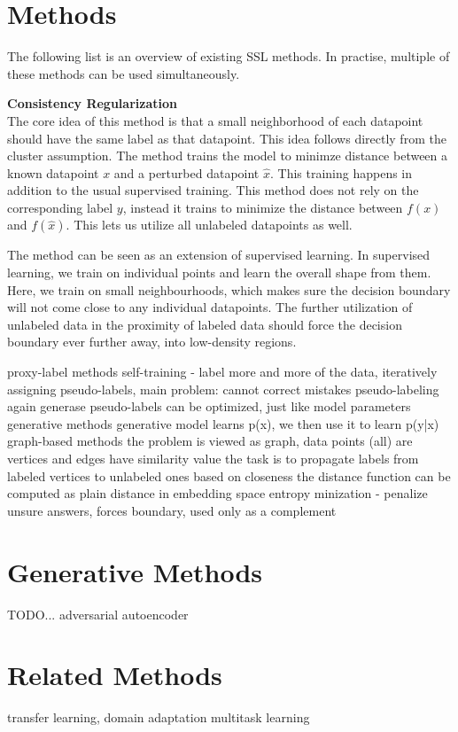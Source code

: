 \section{Methods}
\label{sec:SslMethods}

The following list is an overview of existing SSL methods. In practise, multiple of these methods can be used simultaneously.

\textbf{Consistency Regularization} \\ The core idea of this method is that a small neighborhood of each datapoint should have the same label as that datapoint. This idea follows directly from the cluster assumption. The method trains the model to minimze distance between a known datapoint $x$ and a perturbed datapoint $\hat{x}$. This training happens in addition to the usual supervised training. This method does not rely on the corresponding label $y$, instead it trains to minimize the distance between $f(x)$ and $f(\hat{x})$. This lets us utilize all unlabeled datapoints as well.

The method can be seen as an extension of supervised learning. In supervised learning, we train on individual points and learn the overall shape from them. Here, we train on small neighbourhoods, which makes sure the decision boundary will not come close to any individual datapoints. The further utilization of unlabeled data in the proximity of labeled data should force the decision boundary ever further away, into low-density regions.



proxy-label methods
    self-training - label more and more of the data, iteratively
        assigning pseudo-labels, main problem: cannot correct mistakes
    pseudo-labeling
        again generase pseudo-labels
        can be optimized, just like model parameters
generative methods
    generative model learns p(x), we then use it to learn p(y|x)
graph-based methods
    the problem is viewed as graph, data points (all) are vertices
    and edges have similarity value
    the task is to propagate labels from labeled vertices to unlabeled ones based on closeness
    the distance function can be computed as plain distance in embedding space
entropy minization - penalize unsure answers, forces boundary, used only as a complement


\section{Generative Methods}
\label{sec:GenerativeSslMethods}

TODO...
adversarial autoencoder


\section{Related Methods}
\label{sec:RelatedSslMethods}

transfer learning, domain adaptation
    multitask learning
